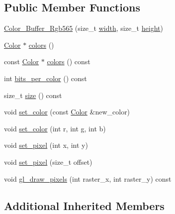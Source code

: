 \subsection*{Public Member Functions}
\begin{DoxyCompactItemize}
\item 
\mbox{\hyperlink{classexample_1_1_color___buffer___rgb565_a06909e8edbc20bcfb6701b8d9b1ec311}{Color\+\_\+\+Buffer\+\_\+\+Rgb565}} (size\+\_\+t \mbox{\hyperlink{classexample_1_1_color___buffer_ab61454d4b35cbba00d2e634d14ed20ac}{width}}, size\+\_\+t \mbox{\hyperlink{classexample_1_1_color___buffer_ae01f4538ee30af1d3072a425c5ad37ac}{height}})
\item 
\mbox{\hyperlink{structexample_1_1_color___buffer___rgb565_1_1_color}{Color}} $\ast$ \mbox{\hyperlink{classexample_1_1_color___buffer___rgb565_a30c98c79fa4b0fc07d031a70b11ede8b}{colors}} ()
\item 
const \mbox{\hyperlink{structexample_1_1_color___buffer___rgb565_1_1_color}{Color}} $\ast$ \mbox{\hyperlink{classexample_1_1_color___buffer___rgb565_a6b70754a098cda8d093f790d6a0f7386}{colors}} () const
\item 
int \mbox{\hyperlink{classexample_1_1_color___buffer___rgb565_ad8125e1f708bd99aafce8ef7b713cc02}{bits\+\_\+per\+\_\+color}} () const
\item 
size\+\_\+t \mbox{\hyperlink{classexample_1_1_color___buffer___rgb565_a06c7547d382ceba07f96f0b8841c35de}{size}} () const
\item 
void \mbox{\hyperlink{classexample_1_1_color___buffer___rgb565_a416142e2f71407a88cc2eebf61a68b47}{set\+\_\+color}} (const \mbox{\hyperlink{structexample_1_1_color___buffer___rgb565_1_1_color}{Color}} \&new\+\_\+color)
\item 
void \mbox{\hyperlink{classexample_1_1_color___buffer___rgb565_ac38babd86731bf63703875706b0138c6}{set\+\_\+color}} (int r, int g, int b)
\item 
void \mbox{\hyperlink{classexample_1_1_color___buffer___rgb565_a0f3e81af58dbe0b6456c239b24221baa}{set\+\_\+pixel}} (int x, int y)
\item 
void \mbox{\hyperlink{classexample_1_1_color___buffer___rgb565_a53f9763360ddbb788e0dfa0ec5a0a9f9}{set\+\_\+pixel}} (size\+\_\+t offset)
\item 
void \mbox{\hyperlink{classexample_1_1_color___buffer___rgb565_a990c8e8f928b672ab82f7364b12eadb2}{gl\+\_\+draw\+\_\+pixels}} (int raster\+\_\+x, int raster\+\_\+y) const
\end{DoxyCompactItemize}
\subsection*{Additional Inherited Members}


